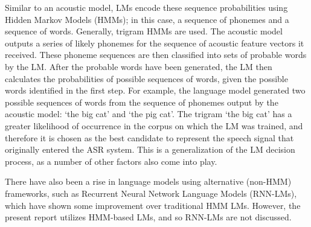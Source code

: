 Similar to an acoustic model, LMs encode these sequence probabilities using Hidden Markov Models (HMMs); in this case, a sequence of phonemes and a sequence of words.  Generally, trigram HMMs are used.  
The acoustic model outputs a series of likely phonemes for the sequence of acoustic feature vectors it received.  These phoneme sequences are then classified into sets of probable words by the LM.  After the probable words have been generated, the LM then calculates the probabilities of possible sequences of words, given the possible words identified in the first step.  For example, the language model generated two possible sequences of words from the sequence of phonemes output by the acoustic model: `the big cat' and `the pig cat'.  The trigram `the big cat' has a greater likelihood of occurrence in the corpus on which the LM was trained, and therefore it is chosen as the best candidate to represent the speech signal that originally entered the ASR system.  This is a generalization of the LM decision process, as a number of other factors also come into play.

There have also been a rise in language models using alternative (non-HMM) frameworks, such as Recurrent Neural Network Language Models (RNN-LMs), which have shown some improvement over traditional HMM LMs.  However, the present report utilizes HMM-based LMs, and so RNN-LMs are not discussed.


